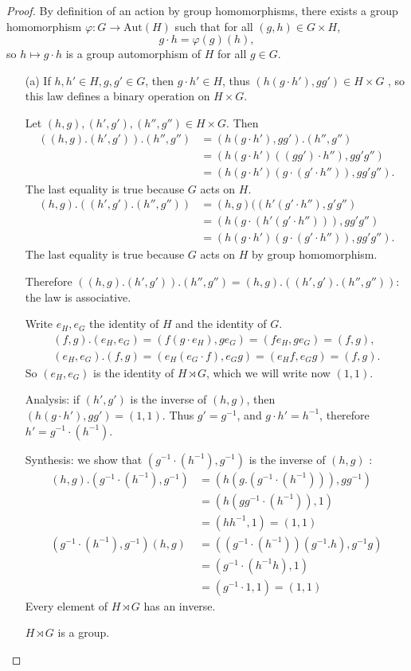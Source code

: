 \documentclass[11pt,a4paper]{article}
\begin{document}
\begin{proof}
By definition of an action by group homomorphisms, there exists a group homomorphism $\varphi:G \to \mathrm{Aut}(H)$ such that for all $(g,h) \in G \times H$,
$$g \cdot h = \varphi(g)(h),$$
so $ h\mapsto g\cdot h$ is a group automorphism of $H$ for all $g\in G$.
\begin{enumerate}
\item[(a)] 
 If $h,h' \in H, g,g' \in G$, then $g\cdot h' \in H$, thus $(h(g\cdot h'),gg') \in H\times G$ , so this law defines a binary operation on $H\times G$.

 Let $(h,g), (h',g'), (h'',g'') \in H\times G$. Then
\begin{align*}
((h,g).(h',g')).(h'',g'') &= (h(g\cdot h'),gg').(h'',g'')\\
&=(h(g\cdot h')((gg')\cdot h''),gg'g'')\\
&=(h(g\cdot h')(g\cdot (g'\cdot h'')),gg'g'').
\end{align*}
The last equality is true because $G$ acts on $H$.
\begin{align*}
(h,g).((h',g').(h'',g'')) &= (h,g)((h'(g'\cdot h''),g'g'')\\
&=(h (g\cdot(h'(g'\cdot h''))),gg'g'')\\
&=(h (g\cdot h') (g\cdot(g' \cdot h'')), gg'g'').
\end{align*}
The last equality is true because $G$ acts on $H$ by group homomorphism.

Therefore $((h,g).(h',g')).(h'',g'') = (h,g).((h',g').(h'',g''))$: the law is associative.

 Write $e_H,e_G$ the identity of $H$ and the identity of $G$.
\begin{align*}
(f,g).(e_H,e_G) = (f (g\cdot e_H), g e_G) =  (f e_H, g e_G) = (f,g),\\
(e_H,e_G).(f,g) = (e_H(e_G\cdot f), e_G g) = (e_H f, e_Gg) = (f,g).
\end{align*}
So $(e_H,e_G)$ is the identity of $H \rtimes G$, which we will write now $(1,1)$.


Analysis: if $(h',g')$ is the inverse of $(h,g)$, then $(h(g\cdot h'),gg') = (1,1)$. Thus $g' = g^{-1}$, and $g\cdot h' = h^{-1}$, therefore $h' = g^{-1} \cdot (h^{-1})$. 

Synthesis: we show that $( g^{-1} \cdot (h^{-1}),g^{-1})$ is the inverse of $(h,g)$ :
\begin{align*}
(h,g).( g^{-1} \cdot (h^{-1}),g^{-1}) &= (h (g.(g^{-1}\cdot (h^{-1}))), g g^{-1})\\
&= (h (g g^{-1}\cdot (h^{-1})), 1)\\
&=(hh^{-1},1) = (1,1)\\
( g^{-1} \cdot (h^{-1}),g^{-1})(h,g) &= ((g^{-1} \cdot (h^{-1})) (g^{-1}.h), g^{-1}g)\\
&=(g^{-1}\cdot(h^{-1}h),1)\\
&=(g^{-1}\cdot 1,1) = (1,1)
\end{align*}
Every element of $H \rtimes G$ has an inverse.
\begin{center}
$H\rtimes G$ is a group.
\end{center}


\end{enumerate}
\end{proof}
\end{document}
